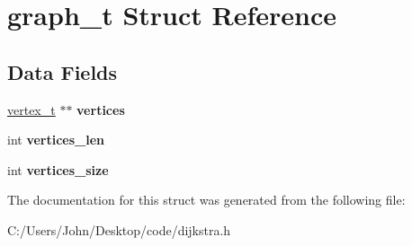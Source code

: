 \hypertarget{structgraph__t}{}\section{graph\+\_\+t Struct Reference}
\label{structgraph__t}
\subsection*{Data Fields}
\begin{DoxyCompactItemize}
\item 
\mbox{\label{structgraph__t_adcc5b340d4068b2e20022bc3dbc5941c}} 
\mbox{\hyperlink{structvertex__t}{vertex\+\_\+t}} $\ast$$\ast$ {\bfseries vertices}
\item 
\mbox{\label{structgraph__t_a29f8a6db947752bd7494cf06135244df}} 
int {\bfseries vertices\+\_\+len}
\item 
\mbox{\label{structgraph__t_ad2f2511466042a8a2182d5da1b1972f6}} 
int {\bfseries vertices\+\_\+size}
\end{DoxyCompactItemize}


The documentation for this struct was generated from the following file\+:\begin{DoxyCompactItemize}
\item 
C\+:/\+Users/\+John/\+Desktop/code/dijkstra.\+h\end{DoxyCompactItemize}
